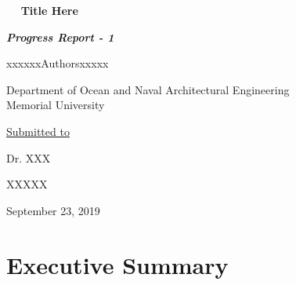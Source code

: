 \documentclass[onecolumn,11pt]{report}
\begin{document}


\begin{titlepage}

~~
\vspace{1cm}
\centering
{\Large\bfseries {Title Here}}

\vspace{2cm}

{\large {\textit {\bf Progress Report - 1}}}

\vspace{2cm}

{\large  xxxxxxAuthorsxxxxx}

\vspace{0.5cm}

{\large Department of Ocean and Naval Architectural Engineering \\ Memorial University}


\vspace{2cm}


{\large \underline{Submitted to}}

\vspace{1cm}

{\large Dr. XXX}

\vspace{0.5cm}

{\large XXXXX}

\vspace{3cm}


{\large September 23, 2019}

\clearpage

\tableofcontents

\listoffigures
 
\listoftables




\makenomenclature
\mbox{}

\printnomenclature

\end{titlepage}





\clearpage

\section*{\centering Executive Summary}
 
\end{document}
